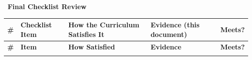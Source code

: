 \documentclass[11pt,letterpaper,oneside]{report}
\renewcommand{\arraystretch}{1.18}
\begin{document}
\renewcommand{\arraystretch}{1.22}
\noindent\colorbox{afnavy}{\parbox{\dimexpr\linewidth-2\fboxsep\relax}{\raggedright\color{white}\sffamily\bfseries\large\, Final Checklist Review\strut}}\par\nobreak\vspace{2pt}\nobreak
\setlength{\tabcolsep}{6pt}%
\begin{longtable}{@{}R{0.45cm} R{3.95cm} R{4.61cm} R{4.61cm} R{1.20cm}@{}}
\toprule
\sffamily\bfseries\# &
\sffamily\bfseries Checklist Item &
\sffamily\bfseries How the Curriculum Satisfies It &
\sffamily\bfseries Evidence (this document) &
\sffamily\bfseries Meets?\\
\midrule
\endfirsthead
\toprule
\sffamily\bfseries\# &
\sffamily\bfseries Item &
\sffamily\bfseries How Satisfied &
\sffamily\bfseries Evidence &
\sffamily\bfseries Meets?\\
\midrule
\endhead
\bottomrule
\endfoot


\end{longtable}
\end{document}
